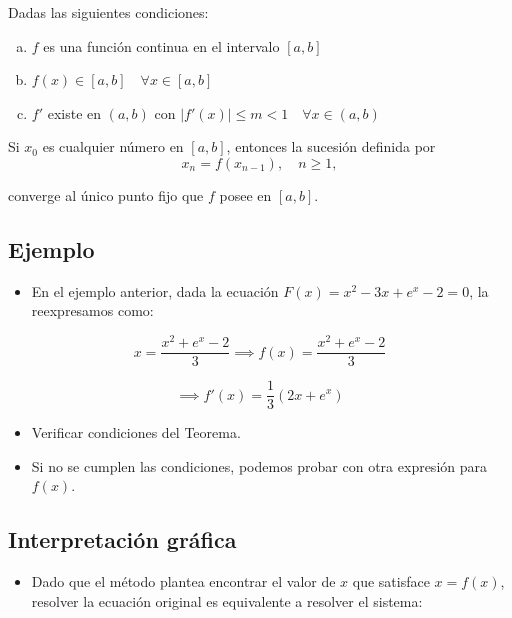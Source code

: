 \documentclass[]{book}
\providecommand{\tightlist}{%
  \setlength{\itemsep}{0pt}\setlength{\parskip}{0pt}}
\begin{document}
Dadas las siguientes condiciones:

\begin{enumerate}[(a)]
\item $f$ es una función continua en el intervalo $[a, b]$
\item $f(x) \in [a, b] \quad \forall x \in [a, b]$
\item $f'$ existe en $(a, b)$ con $|f'(x)| \le m < 1 \quad \forall x \in (a, b)$
\end{enumerate}

Si \(x_0\) es cualquier número en \([a, b]\), entonces la sucesión definida por
\[ x_n = f(x_{n-1}), \quad n \ge 1,\]

converge al único punto fijo que \(f\) posee en \([a, b]\).

\hypertarget{ejemplo-4}{%
\subsection{Ejemplo}\label{ejemplo-4}}

\begin{itemize}
\tightlist
\item
  En el ejemplo anterior, dada la ecuación \(F(x) = x^2-3x+e^x-2=0\), la reexpresamos como:
\end{itemize}

\[x = \frac{x^2+e^x-2}{3} \implies f(x)= \frac{x^2+e^x-2}{3}\]

\[\implies f'(x) = \frac{1}{3}(2x+e^x)\]

\begin{itemize}
\tightlist
\item
  Verificar condiciones del Teorema.
\item
  Si no se cumplen las condiciones, podemos probar con otra expresión para \(f(x)\).
\end{itemize}

\hypertarget{interpretaciuxf3n-gruxe1fica}{%
\subsection{Interpretación gráfica}\label{interpretaciuxf3n-gruxe1fica}}

\begin{itemize}
\tightlist
\item
  Dado que el método plantea encontrar el valor de \(x\) que satisface \(x = f(x)\), resolver la ecuación original es equivalente a resolver el sistema:
\end{itemize}
\end{document}
